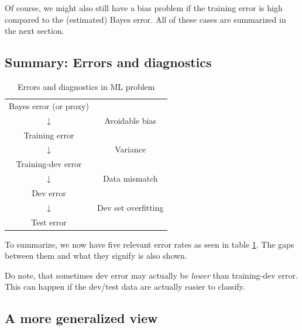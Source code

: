\documentclass[12pt, a4paper]{article}
\numberwithin{equation}{section}
\begin{document}
Of course, we might also still have a bias problem if the training error is high compared to the (estimated) Bayes error. All of these cases are summarized in the next section.

\subsection{Summary: Errors and diagnostics}

\begin{table}[b]
\centering
\label{table:diagnostic}
\begin{tabular}{cc}
Bayes error (or proxy) &                           \\
$\downarrow$           & Avoidable bias            \\
Training error         &                           \\
$\downarrow$           & Variance                  \\
Training-dev error     &                           \\
$\downarrow$           & Data mismatch             \\
Dev error              &                           \\
$\downarrow$           & Dev set overfitting       \\
Test error             &                          
\end{tabular}
\caption{Errors and diagnostics in ML problem}
\end{table}

To summarize, we now have five relevant error rates as seen in table \ref{table:diagnostic}. The gaps between them and what they signify is also shown.

Do note, that sometimes dev error may actually be \emph{lower} than training-dev error. This can happen if the dev/test data are actually easier to classify.

\subsection{A more generalized view}
\end{document}

